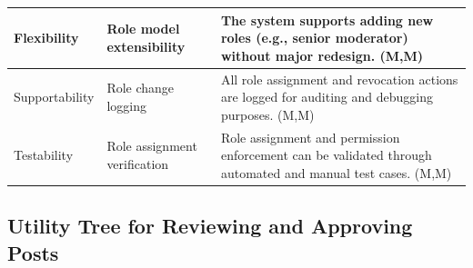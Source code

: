 \documentclass{article}
\begin{document}
\begin{table}[H]
\begin{tabular}{|p{3cm}|p{4cm}|p{7cm}|}
Flexibility
& Role model extensibility
& The system supports adding new roles (e.g., senior moderator) without major redesign. (M,M) \\
\hline

Supportability
& Role change logging
& All role assignment and revocation actions are logged for auditing and debugging purposes. (M,M) \\
\hline

Testability
& Role assignment verification
& Role assignment and permission enforcement can be validated through automated and manual test cases. (M,M) \\
\hline

\end{tabular}
\end{table}

\subsection{Utility Tree for Reviewing and Approving Posts}
\end{document}
